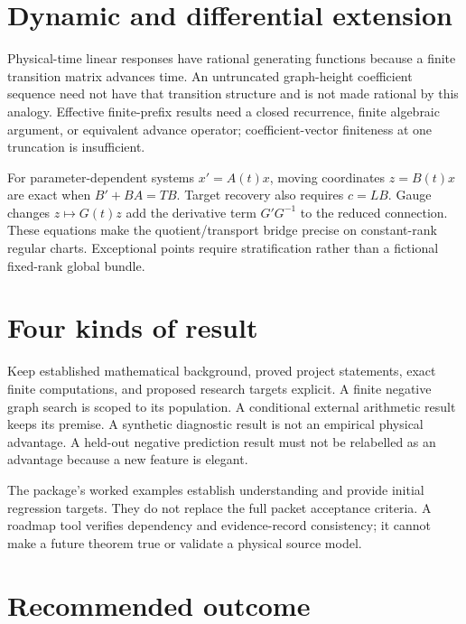 \documentclass[
  11pt,
  a4paper,
]{report}
\begin{document}
\hypertarget{dynamic-and-differential-extension}{%
\section{Dynamic and differential
extension}\label{dynamic-and-differential-extension}}

Physical-time linear responses have rational generating functions
because a finite transition matrix advances time. An untruncated
graph-height coefficient sequence need not have that transition
structure and is not made rational by this analogy. Effective
finite-prefix results need a closed recurrence, finite algebraic
argument, or equivalent advance operator; coefficient-vector finiteness
at one truncation is insufficient.

For parameter-dependent systems \(x'=A(t)x\), moving coordinates
\(z=B(t)x\) are exact when \(B'+BA=TB\). Target recovery also requires
\(c=LB\). Gauge changes \(z\mapsto G(t)z\) add the derivative term
\(G'G^{-1}\) to the reduced connection. These equations make the
quotient/transport bridge precise on constant-rank regular charts.
Exceptional points require stratification rather than a fictional
fixed-rank global bundle.

\hypertarget{four-kinds-of-result}{%
\section{Four kinds of result}\label{four-kinds-of-result}}

Keep established mathematical background, proved project statements,
exact finite computations, and proposed research targets explicit. A
finite negative graph search is scoped to its population. A conditional
external arithmetic result keeps its premise. A synthetic diagnostic
result is not an empirical physical advantage. A held-out negative
prediction result must not be relabelled as an advantage because a new
feature is elegant.

The package's worked examples establish understanding and provide
initial regression targets. They do not replace the full packet
acceptance criteria. A roadmap tool verifies dependency and
evidence-record consistency; it cannot make a future theorem true or
validate a physical source model.

\hypertarget{recommended-outcome}{%
\section{Recommended outcome}\label{recommended-outcome}}
\end{document}
